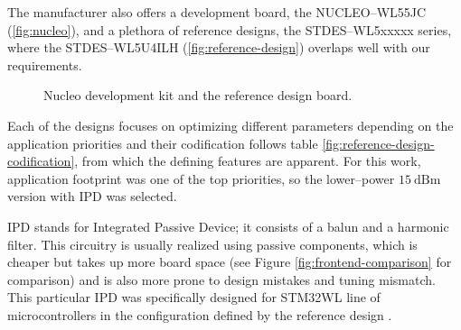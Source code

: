 The manufacturer also offers a development board, the NUCLEO--WL55JC (\ref{fig:nucleo}), and a plethora of reference designs, the STDES--WL5xxxxx series, where the STDES--WL5U4ILH (\ref{fig:reference-design}) overlaps well with our requirements.

\begin{figure}
    \centering
    \caption{\label{fig:nucleo-and-reference}Nucleo development kit and the reference design board.}
\end{figure}

Each of the designs focuses on optimizing different parameters depending on the application priorities and their codification follows table \ref{fig:reference-design-codification}, from which the defining features are apparent. For this work, application footprint was one of the top priorities, so the lower--power $15~\mathrm{dBm}$ version with IPD was selected.

IPD stands for Integrated Passive Device; it consists of a balun and a harmonic filter. This circuitry is usually realized using passive components, which is cheaper but takes up more board space (see Figure \ref{fig:frontend-comparison} for comparison) and is also more prone to design mistakes and tuning mismatch. This particular IPD was specifically designed for STM32WL line of microcontrollers in the configuration defined by the reference design \cite{stmicroelectronics_balfhb-wl-05d3_2024}.

